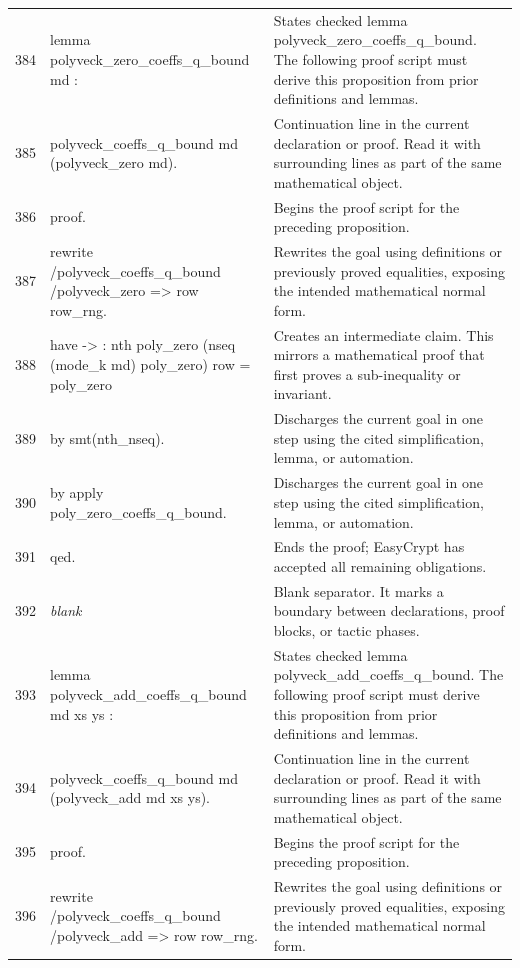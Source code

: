 \documentclass[10pt]{article}
\begin{document}
\begin{longtable}{r L{0.53\textwidth} L{0.37\textwidth}}
384 & {\ttfamily\scriptsize lemma polyveck\_zero\_coeffs\_q\_bound md :} & States checked lemma polyveck\_zero\_coeffs\_q\_bound.  The following proof script must derive this proposition from prior definitions and lemmas. \\
385 & {\ttfamily\scriptsize   polyveck\_coeffs\_q\_bound md (polyveck\_zero md).} & Continuation line in the current declaration or proof.  Read it with surrounding lines as part of the same mathematical object. \\
386 & {\ttfamily\scriptsize proof.} & Begins the proof script for the preceding proposition. \\
387 & {\ttfamily\scriptsize rewrite /polyveck\_coeffs\_q\_bound /polyveck\_zero => row row\_rng.} & Rewrites the goal using definitions or previously proved equalities, exposing the intended mathematical normal form. \\
388 & {\ttfamily\scriptsize have -> : nth poly\_zero (nseq (mode\_k md) poly\_zero) row = poly\_zero} & Creates an intermediate claim.  This mirrors a mathematical proof that first proves a sub-inequality or invariant. \\
389 & {\ttfamily\scriptsize   by smt(nth\_nseq).} & Discharges the current goal in one step using the cited simplification, lemma, or automation. \\
390 & {\ttfamily\scriptsize by apply poly\_zero\_coeffs\_q\_bound.} & Discharges the current goal in one step using the cited simplification, lemma, or automation. \\
391 & {\ttfamily\scriptsize qed.} & Ends the proof; EasyCrypt has accepted all remaining obligations. \\
392 & {\ttfamily\scriptsize \emph{blank}} & Blank separator.  It marks a boundary between declarations, proof blocks, or tactic phases. \\
393 & {\ttfamily\scriptsize lemma polyveck\_add\_coeffs\_q\_bound md xs ys :} & States checked lemma polyveck\_add\_coeffs\_q\_bound.  The following proof script must derive this proposition from prior definitions and lemmas. \\
394 & {\ttfamily\scriptsize   polyveck\_coeffs\_q\_bound md (polyveck\_add md xs ys).} & Continuation line in the current declaration or proof.  Read it with surrounding lines as part of the same mathematical object. \\
395 & {\ttfamily\scriptsize proof.} & Begins the proof script for the preceding proposition. \\
396 & {\ttfamily\scriptsize rewrite /polyveck\_coeffs\_q\_bound /polyveck\_add => row row\_rng.} & Rewrites the goal using definitions or previously proved equalities, exposing the intended mathematical normal form. \\

\end{longtable}
\end{document}
